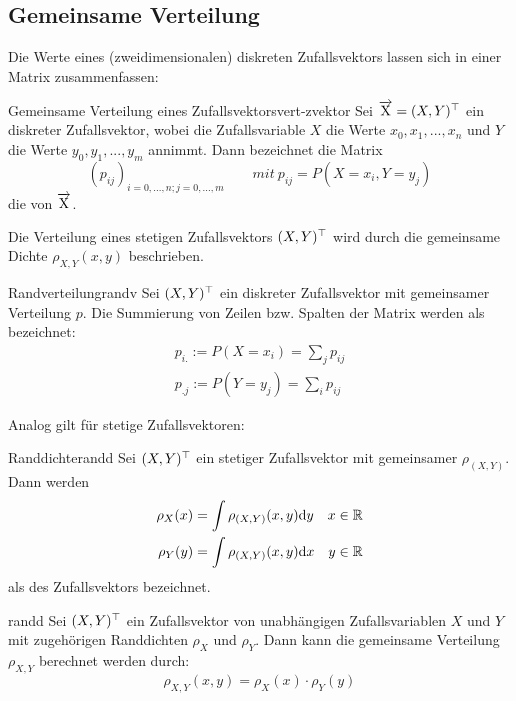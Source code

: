 \subsection{Gemeinsame Verteilung}

Die Werte eines (zweidimensionalen) diskreten Zufallsvektors lassen sich in einer Matrix
zusammenfassen:

\begin{definition}{Gemeinsame Verteilung eines Zufallsvektors}{vert-zvektor}
Sei $\overrightarrow{\mathrm{X}} = (X, Y)^\top$ ein diskreter Zufallsvektor, wobei die
Zufallsvariable $X$ die Werte $x_0, x_1, ..., x_n$ und $Y$ die Werte $y_0, y_1, ...,
y_m$ annimmt. Dann bezeichnet die Matrix
\[
(p_{ij})_{i=0,...,n;j=0,...,m} \qquad mit\ p_{ij} = P(X=x_i, Y=y_j)
\]
die  von $\overrightarrow{\mathrm{X}}$.

Die Verteilung eines stetigen Zufallsvektors $(X,Y)^\top$ wird durch die gemeinsame
Dichte $\rho_{X,Y}(x,y)$ beschrieben.
\end{definition}

\begin{definition}{Randverteilung}{randv}
Sei $(X,Y)^\top$ ein diskreter Zufallsvektor mit gemeinsamer Verteilung $p$.
Die Summierung von Zeilen bzw. Spalten der Matrix werden als
 bezeichnet:
\begin{align*}
p_{i.}:=P(X=x_i) = \sum_j p_{ij} \\
p_{.j}:=P(Y=y_j) = \sum_i p_{ij}
\end{align*}
\end{definition}

Analog gilt für stetige Zufallsvektoren:
\begin{definition}{Randdichte}{randd}
Sei $(X,Y)^\top$ ein stetiger Zufallsvektor mit gemeinsamer 
$\rho_{(X, Y)}$. Dann werden
\begin{align*}
\rho_X(x) = \int\rho_{(X,Y)}(x,y)\mathrm{d} y\quad x\in\mathbb{R}\\
\rho_Y(y) = \int\rho_{(X,Y)}(x,y)\mathrm{d} x\quad y\in\mathbb{R}
\end{align*}
als  des Zufallsvektors bezeichnet.
\end{definition}

\begin{theorem}{}{randd}
Sei $(X,Y)^\top$ ein Zufallsvektor von unabhängigen Zufallsvariablen $X$ und $Y$
mit zugehörigen Randdichten $\rho_X$ und $\rho_Y$. Dann kann die gemeinsame
Verteilung $\rho_{X,Y}$ berechnet werden durch:
\[
\rho_{X,Y}(x,y) = \rho_X(x)\cdot\rho_Y(y)
\]
\end{theorem}

